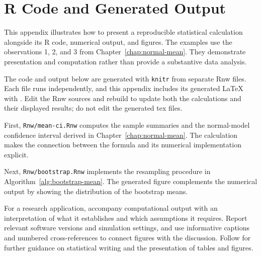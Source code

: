 \chapter{R Code and Generated Output}
\label{app:r-code}

This appendix illustrates how to present a reproducible statistical
calculation alongside its R code, numerical output, and figures. The examples
use the observations 1, 2, and 3 from Chapter~\ref{chap:normal-mean}. They
demonstrate presentation and computation rather than provide a substantive
data analysis.


The code and output below are generated with \texttt{knitr} from separate Rnw
files. Each file runs independently, and this appendix includes its generated
LaTeX with \verb||. Edit the Rnw sources and rebuild to update both the
calculations and their displayed results; do not edit the generated tex files.


First, \texttt{Rnw/mean-ci.Rnw} computes the sample summaries and the
normal-model confidence interval derived in Chapter~\ref{chap:normal-mean}.
The calculation makes the connection between the formula and its numerical
implementation explicit.




Next, \texttt{Rnw/bootstrap.Rnw} implements the resampling procedure in
Algorithm~\ref{alg:bootstrap-mean}. The generated figure complements the
numerical output by showing the distribution of the bootstrap means.




For a research application, accompany computational output with an
interpretation of what it establishes and which assumptions it requires.
Report relevant software versions and simulation settings, and use informative
captions and numbered cross-references to connect figures with the discussion.
Follow \citet{schifano2026statistical} for further guidance on statistical
writing and the presentation of tables and figures.
